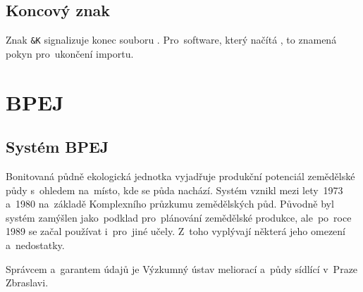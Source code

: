 
\subsection{Koncový znak}
\label{koncovy_znak}

Znak \texttt{\&K} signalizuje konec souboru . Pro~software, který načítá , to znamená pokyn pro~ukončení importu.

\section{BPEJ}
\label{bpej}

\subsection{Systém BPEJ}
\label{system_bpej}

Bonitovaná půdně ekologická jednotka vyjadřuje produkční potenciál zemědělské půdy s~ohledem na~místo, kde se půda nachází. Systém  vznikl mezi lety~1973 a~1980 na~základě Komplexního průzkumu zemědělských půd. Původně byl systém  zamýšlen jako~podklad pro~plánování zemědělské produkce, ale~po~roce 1989 se začal používat i~pro~jiné učely. Z~toho vyplývají některá jeho omezení a~nedostatky.

Správcem a~garantem údajů  je Výzkumný ústav meliorací a~půdy sídlící v~Praze Zbraslavi.

